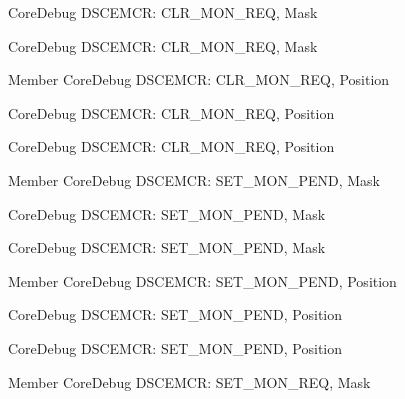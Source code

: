 \begin{DoxyRefList}
\label{deprecated__deprecated000625}%
%
Core\+Debug DSCEMCR\+: CLR\+\_\+\+MON\+\_\+\+REQ, Mask 

\label{deprecated__deprecated000072}%
%
Core\+Debug DSCEMCR\+: CLR\+\_\+\+MON\+\_\+\+REQ, Mask  
\item[Member \doxylink{group__CMSIS__SCB_ga1e2e3a310143f4663f1c415c03c3d535}{Core\+Debug\+\_\+\+DSCEMCR\+\_\+\+CLR\+\_\+\+MON\+\_\+\+REQ\+\_\+\+Pos} ]\label{deprecated__deprecated000522}%
%
Core\+Debug DSCEMCR\+: CLR\+\_\+\+MON\+\_\+\+REQ, Position 

\label{deprecated__deprecated000071}%
%
Core\+Debug DSCEMCR\+: CLR\+\_\+\+MON\+\_\+\+REQ, Position 

\label{deprecated__deprecated000624}%
%
Core\+Debug DSCEMCR\+: CLR\+\_\+\+MON\+\_\+\+REQ, Position  
\item[Member \doxylink{group__CMSIS__SCB_ga575045239507b73f338bcbb959ac6904}{Core\+Debug\+\_\+\+DSCEMCR\+\_\+\+SET\+\_\+\+MON\+\_\+\+PEND\+\_\+\+Msk} ]\label{deprecated__deprecated000078}%
%
Core\+Debug DSCEMCR\+: SET\+\_\+\+MON\+\_\+\+PEND, Mask 

\label{deprecated__deprecated000529}%
%
Core\+Debug DSCEMCR\+: SET\+\_\+\+MON\+\_\+\+PEND, Mask 

\label{deprecated__deprecated000631}%
%
Core\+Debug DSCEMCR\+: SET\+\_\+\+MON\+\_\+\+PEND, Mask  
\item[Member \doxylink{group__CMSIS__SCB_ga644ae3a13bcb9f2a80326bc5824f1b28}{Core\+Debug\+\_\+\+DSCEMCR\+\_\+\+SET\+\_\+\+MON\+\_\+\+PEND\+\_\+\+Pos} ]\label{deprecated__deprecated000528}%
%
Core\+Debug DSCEMCR\+: SET\+\_\+\+MON\+\_\+\+PEND, Position 

\label{deprecated__deprecated000077}%
%
Core\+Debug DSCEMCR\+: SET\+\_\+\+MON\+\_\+\+PEND, Position 

\label{deprecated__deprecated000630}%
%
Core\+Debug DSCEMCR\+: SET\+\_\+\+MON\+\_\+\+PEND, Position  
\item[Member \doxylink{group__CMSIS__SCB_ga73d8960abbd67eeda64f27a77ed7baf2}{Core\+Debug\+\_\+\+DSCEMCR\+\_\+\+SET\+\_\+\+MON\+\_\+\+REQ\+\_\+\+Msk} ]\label{deprecated__deprecated000527}%
%
Core\+Debug DSCEMCR\+: SET\+\_\+\+MON\+\_\+\+REQ, Mask 


\end{DoxyRefList}
